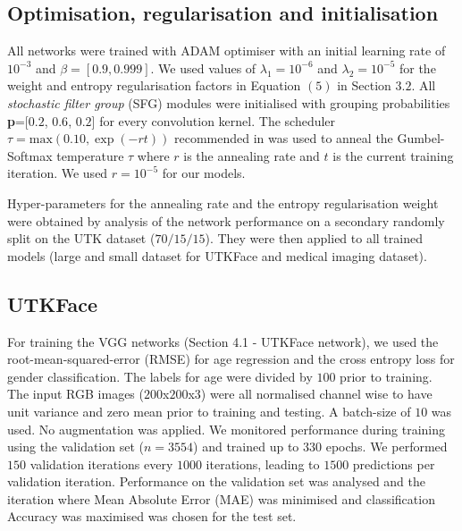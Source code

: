 \subsection{Optimisation, regularisation and initialisation}
All networks were trained with ADAM optimiser \cite{ADAM} with an initial learning rate of $10^{-3}$ and $\beta = [0.9, 0.999]$. We used values of $\lambda_1=10^{-6}$ and $\lambda_2=10^{-5}$ for the weight and entropy regularisation factors in Equation $(5)$ in Section $3.2$. All \emph{stochastic filter group} (SFG) modules were initialised with grouping probabilities \textbf{p}=[$0.2$, $0.6$, $0.2$] for every convolution kernel.  The scheduler $\tau = \text{max}(0.10, \exp(-rt))$ recommended in \cite{jang2016categorical} was used to anneal the Gumbel-Softmax temperature $\tau$ where $r$ is the annealing rate and $t$ is the current training iteration. We used $r=10^{-5}$ for our models.

Hyper-parameters for the annealing rate and the entropy regularisation weight were obtained by analysis of the network performance on a secondary randomly split on the UTK dataset ($70/15/15$). They were then applied to all trained models (large and small dataset for UTKFace and medical imaging dataset).

\subsection{UTKFace}
For training the VGG networks (Section 4.1 - UTKFace network), we used the root-mean-squared-error (RMSE) for age regression and the cross entropy loss for gender classification. The labels for age were divided by $100$ prior to training. The input RGB images ($200$x$200$x$3$) were all normalised channel wise to have unit variance and zero mean prior to training and testing. A batch-size of $10$ was used. No augmentation was applied. We monitored performance during training using the validation set ($n=3554$) and trained up to $330$ epochs. We performed $150$ validation iterations every $1000$ iterations, leading to $1500$ predictions per validation iteration. Performance on the validation set was analysed and the iteration where Mean Absolute Error (MAE) was minimised and classification Accuracy was maximised was chosen for the test set.

